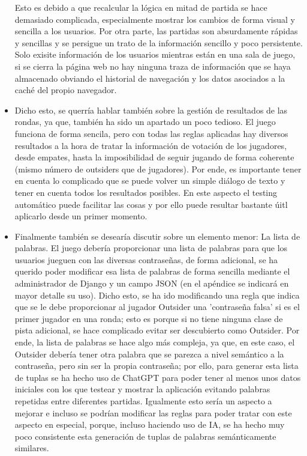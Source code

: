 \begin{itemize}
		  Esto es debido a que recalcular la lógica en mitad de partida se hace demasiado complicada, especialmente mostrar los cambios de forma visual y sencilla a los usuarios. Por otra parte, las partidas son
		  absurdamente rápidas y sencillas y se persigue un trato de la información sencillo y poco persistente. Solo exisite información de los usuarios mientras están en una sala de juego, si se cierra la página 
		  web no hay ninguna traza de información que se haya almacenado obviando el historial de navegación y los datos asociados a la caché del propio navegador.

	\item Dicho esto, se querría hablar también sobre la gestión de resultados de las rondas, ya que, también ha sido un apartado un poco tedioso. El juego funciona de forma sencila, pero con todas las reglas aplicadas
		  hay diversos resultados a la hora de tratar la información de votación de los jugadores, desde empates, hasta la imposibilidad de seguir jugando de forma coherente (mismo número de outsiders que de jugadores).
		  Por ende, es importante tener en cuenta lo complicado que se puede volver un simple diálogo de texto y tener en cuenta todos los resultados posibles. En este aspecto el testing automático puede facilitar las
		  cosas y por ello puede resultar bastante úitl aplicarlo desde un primer momento.

	\item Finalmente también se desearía discutir sobre un elemento menor: La lista de palabras. El juego debería proporcionar una lista de palabras para que los usuarios jueguen con las 
		  diversas contraseñas, de forma adicional, se ha querido poder modificar esa lista de palabras de forma sencilla mediante el administrador de Django y un campo JSON (en el apéndice se indicará en mayor detalle su uso).
		  Dicho esto, se ha ido modificando una regla que indica que se le debe proporcionar al jugador Outsider una 'contraseña falsa' si es el primer jugador en una ronda; esto es porque si 
		  no tiene ninguna clase de pista adicional, se hace complicado evitar ser descubierto como Outsider. Por ende, la lista de palabras se hace algo más compleja, ya que, en este caso, el Outsider
		  debería tener otra palabra que se parezca a nivel semántico a la contraseña, pero sin ser la propia contraseña; por ello, para generar esta lista de tuplas se ha hecho uso de ChatGPT \cite{ChatGPT} para
		  poder tener al menos unos datos iniciales con los que testear y mostrar la aplicación evitando palabras repetidas entre diferentes partidas. Igualmente esto sería un aspecto a mejorar e incluso
		  se podrían modificar las reglas para poder tratar con este aspecto en especial, porque, incluso haciendo uso de IA, se ha hecho muy poco consistente esta generación de tuplas de palabras semánticamente similares.
		
\end{itemize}


